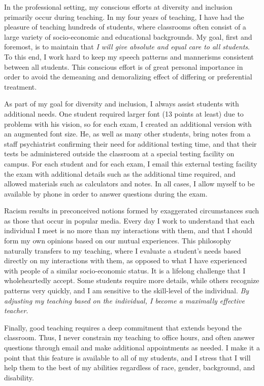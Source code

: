 \documentclass[a4paper,11pt]{article}
\begin{document}
In the professional setting, my conscious efforts at diversity and inclusion primarily occur during teaching. In my four years of teaching, I have had the pleasure of teaching hundreds of students, where classrooms often consist of a large variety of socio-economic and educational backgrounds. My goal, first and foremost, is to maintain that \textit{I will give absolute and equal care to all students}. To this end, I work hard to keep my speech patterns and mannerisms consistent between all students. This conscious effort is of great personal importance in order to avoid the demeaning and demoralizing effect of differing or preferential treatment.

As part of my goal for diversity and inclusion, I always assist students with additional needs. One student required larger font (13 points at least) due to problems with his vision, so for each exam, I created an additional version with an augmented font size. He, as well as many other students, bring notes from a staff psychiatrist confirming their need for additional testing time, and that their tests be administered outside the classroom at a special testing facility on campus. For each student and for each exam, I email this external testing facility the exam with additional details such as the additional time required, and allowed materials such as calculators and notes. In all cases, I allow myself to be available by phone in order to answer questions during the exam.

Racism results in preconceived notions formed by exaggerated circumstances such as those that occur in popular media. Every day I work to understand that each individual I meet is no more than my interactions with them, and that I should form my own opinions based on our mutual experiences. This philosophy naturally transfers to my teaching, where I evaluate a student's needs based directly on my interactions with them, as opposed to what I have experienced with people of a similar socio-economic status. It is a lifelong challenge that I wholeheartedly accept. Some students require more details, while others recognize patterns very quickly, and I am sensitive to the skill-level of the individual. \textit{By adjusting my teaching based on the individual, I become a maximally effective teacher}.

Finally, good teaching requires a deep commitment that extends beyond the classroom. Thus, I never constrain my teaching to office hours, and often answer questions through email and make additional appointments as needed. I make it a point that this feature is available to all of my students, and I stress that I will help them to the best of my abilities regardless of race, gender, background, and disability.
 
\end{document}
